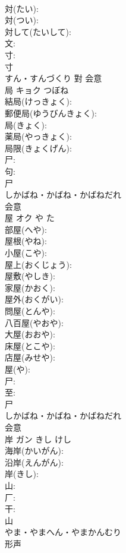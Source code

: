 \documentclass[8pt]{extreport}
\begin{document}
\begin{CJK}{UTF8}{min}
\\	対(たい): 
\\	対(つい): 
\\	対して(たいして): 
\\	文: 
\\	寸: 
\\	寸	
\\	すん・すんづくり	對	会意 
\\	局	キョク	つぼね		
\\	結局(けっきょく): 
\\	郵便局(ゆうびんきょく): 
\\	局(きょく): 
\\	薬局(やっきょく): 
\\	局限(きょくげん): 
\\	尸: 
\\	句: 
\\	尸	
\\	しかばね・かばね・かばねだれ	
\\	会意 
\\	屋	オク	や	た	
\\	部屋(へや): 
\\	屋根(やね): 
\\	小屋(こや): 
\\	屋上(おくじょう): 
\\	屋敷(やしき): 
\\	家屋(かおく): 
\\	屋外(おくがい): 
\\	問屋(とんや): 
\\	八百屋(やおや): 
\\	大屋(おおや): 
\\	床屋(とこや): 
\\	店屋(みせや): 
\\	屋(や): 
\\	尸: 
\\	至: 
\\	尸	
\\	しかばね・かばね・かばねだれ	
\\	会意 
\\	岸	ガン	きし	けし	
\\	海岸(かいがん): 
\\	沿岸(えんがん): 
\\	岸(きし): 
\\	山: 
\\	厂: 
\\	干: 
\\	山	
\\	やま・やまへん・やまかんむり	
\\	形声 

\end{CJK}
\end{document}
